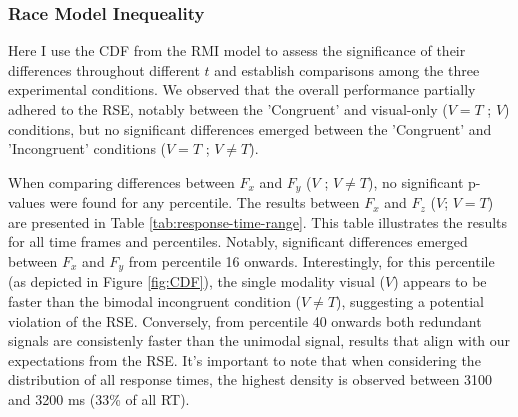 \documentclass[12pt,oneside,openright]{report}
\begin{document}
\subsubsection*{Race Model Inequeality}

Here I use the CDF from the RMI model to assess the significance of their differences throughout different $t$ and establish comparisons among the three experimental conditions. We observed that the overall performance partially adhered to the RSE, notably between the 'Congruent' and visual-only ($V=T$ ; $V$) conditions, but no significant differences emerged between the 'Congruent' and 'Incongruent' conditions ($V=T$ ; $V \neq T$). 

When comparing differences between $F_x$ and $F_y$ ($V$ ; $V \neq T$), no significant p-values were found for any percentile. The results between $F_x$ and $F_z$ ($V$; $V=T$) are presented in Table \ref{tab:response-time-range}. This table illustrates the results for all time frames and percentiles. Notably, significant differences emerged between $F_x$ and $F_y$ from percentile 16 onwards. Interestingly, for this percentile (as depicted in Figure \ref{fig:CDF}), the single modality visual ($V$) appears to be faster than the bimodal incongruent condition ($V \neq T$), suggesting a potential violation of the RSE. Conversely, from percentile 40 onwards both redundant signals are consistenly faster than the unimodal signal, results that align with our expectations from the RSE. It's important to note that when considering the distribution of all response times, the highest density is observed between 3100 and 3200 ms (33\% of all RT).
 
\end{document}
